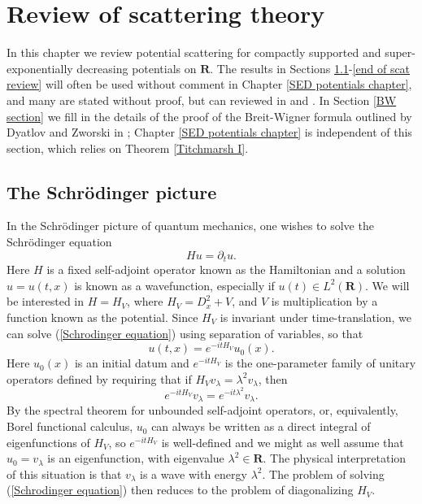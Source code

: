 \documentclass[12pt]{report}
\newcommand{\RR}{\mathbf{R}}
\theoremstyle{definition}
\begin{document}
\chapter{Review of scattering theory}
\label{review of scattering theory}
In this chapter we review potential scattering for compactly supported and super-exponentially decreasing potentials on $\RR$. The results in Sections \ref{beginning of scat review}-\ref{end of scat review} will often be used without comment in Chapter \ref{SED potentials chapter}, and many are stated without proof, but can reviewed in \cite{dyatlov2019mathematical} and \cite{tang2007potential}.
In Section \ref{BW section} we fill in the details of the proof of the Breit-Wigner formula outlined by Dyatlov and Zworski in \cite{dyatlov2019mathematical}; Chapter \ref{SED potentials chapter} is independent of this section, which relies on Theorem \ref{Titchmarsh I}.

\section{The Schr\"odinger picture}
\label{beginning of scat review}
In the Schr\"odinger picture of quantum mechanics, one wishes to solve the Schr\"odinger equation
\begin{equation}
\label{Schrodinger equation}
Hu = \partial_tu.
\end{equation}
Here $H$ is a fixed self-adjoint operator known as the Hamiltonian and a solution $u = u(t, x)$ is known as a wavefunction, especially if $u(t) \in L^2(\RR)$.
We will be interested in $H = H_V$, where $H_V = D^2_x + V$, and $V$ is multiplication by a function known as the potential.
Since $H_V$ is invariant under time-translation, we can solve (\ref{Schrodinger equation}) using separation of variables, so that
$$u(t, x) = e^{-itH_V}u_0(x).$$
Here $u_0(x)$ is an initial datum and $e^{-itH_V}$ is the one-parameter family of unitary operators defined by requiring that if $H_Vv_\lambda = \lambda^2v_\lambda$, then
$$e^{-itH_V}v_\lambda = e^{-it\lambda^2}v_\lambda.$$
By the spectral theorem for unbounded self-adjoint operators, or, equivalently, Borel functional calculus, $u_0$ can always be written as a direct integral of eigenfunctions of $H_V$,
so $e^{-itH_V}$ is well-defined and we might as well assume that $u_0 = v_\lambda$ is an eigenfunction, with eigenvalue $\lambda^2 \in \RR$.
The physical interpretation of this situation is that $v_\lambda$ is a wave with energy $\lambda^2$.
The problem of solving (\ref{Schrodinger equation}) then reduces to the problem of diagonalizing $H_V$.
\end{document}
